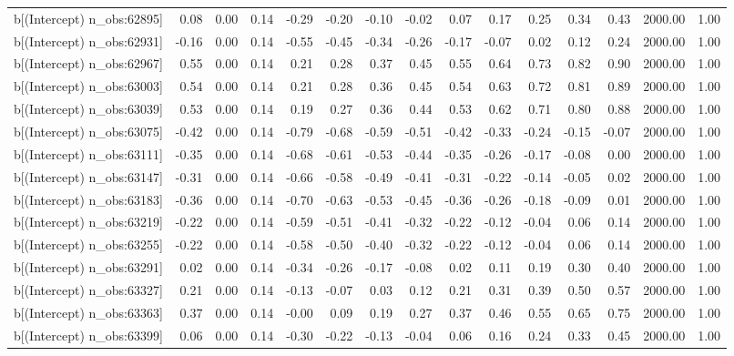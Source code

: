 \begin{table}[ht]
\begin{tabular}{rrrrrrrrrrrrrrr}
  b[(Intercept) n\_obs:62895] & 0.08 & 0.00 & 0.14 & -0.29 & -0.20 & -0.10 & -0.02 & 0.07 & 0.17 & 0.25 & 0.34 & 0.43 & 2000.00 & 1.00 \\ 
  b[(Intercept) n\_obs:62931] & -0.16 & 0.00 & 0.14 & -0.55 & -0.45 & -0.34 & -0.26 & -0.17 & -0.07 & 0.02 & 0.12 & 0.24 & 2000.00 & 1.00 \\ 
  b[(Intercept) n\_obs:62967] & 0.55 & 0.00 & 0.14 & 0.21 & 0.28 & 0.37 & 0.45 & 0.55 & 0.64 & 0.73 & 0.82 & 0.90 & 2000.00 & 1.00 \\ 
  b[(Intercept) n\_obs:63003] & 0.54 & 0.00 & 0.14 & 0.21 & 0.28 & 0.36 & 0.45 & 0.54 & 0.63 & 0.72 & 0.81 & 0.89 & 2000.00 & 1.00 \\ 
  b[(Intercept) n\_obs:63039] & 0.53 & 0.00 & 0.14 & 0.19 & 0.27 & 0.36 & 0.44 & 0.53 & 0.62 & 0.71 & 0.80 & 0.88 & 2000.00 & 1.00 \\ 
  b[(Intercept) n\_obs:63075] & -0.42 & 0.00 & 0.14 & -0.79 & -0.68 & -0.59 & -0.51 & -0.42 & -0.33 & -0.24 & -0.15 & -0.07 & 2000.00 & 1.00 \\ 
  b[(Intercept) n\_obs:63111] & -0.35 & 0.00 & 0.14 & -0.68 & -0.61 & -0.53 & -0.44 & -0.35 & -0.26 & -0.17 & -0.08 & 0.00 & 2000.00 & 1.00 \\ 
  b[(Intercept) n\_obs:63147] & -0.31 & 0.00 & 0.14 & -0.66 & -0.58 & -0.49 & -0.41 & -0.31 & -0.22 & -0.14 & -0.05 & 0.02 & 2000.00 & 1.00 \\ 
  b[(Intercept) n\_obs:63183] & -0.36 & 0.00 & 0.14 & -0.70 & -0.63 & -0.53 & -0.45 & -0.36 & -0.26 & -0.18 & -0.09 & 0.01 & 2000.00 & 1.00 \\ 
  b[(Intercept) n\_obs:63219] & -0.22 & 0.00 & 0.14 & -0.59 & -0.51 & -0.41 & -0.32 & -0.22 & -0.12 & -0.04 & 0.06 & 0.14 & 2000.00 & 1.00 \\ 
  b[(Intercept) n\_obs:63255] & -0.22 & 0.00 & 0.14 & -0.58 & -0.50 & -0.40 & -0.32 & -0.22 & -0.12 & -0.04 & 0.06 & 0.14 & 2000.00 & 1.00 \\ 
  b[(Intercept) n\_obs:63291] & 0.02 & 0.00 & 0.14 & -0.34 & -0.26 & -0.17 & -0.08 & 0.02 & 0.11 & 0.19 & 0.30 & 0.40 & 2000.00 & 1.00 \\ 
  b[(Intercept) n\_obs:63327] & 0.21 & 0.00 & 0.14 & -0.13 & -0.07 & 0.03 & 0.12 & 0.21 & 0.31 & 0.39 & 0.50 & 0.57 & 2000.00 & 1.00 \\ 
  b[(Intercept) n\_obs:63363] & 0.37 & 0.00 & 0.14 & -0.00 & 0.09 & 0.19 & 0.27 & 0.37 & 0.46 & 0.55 & 0.65 & 0.75 & 2000.00 & 1.00 \\ 
  b[(Intercept) n\_obs:63399] & 0.06 & 0.00 & 0.14 & -0.30 & -0.22 & -0.13 & -0.04 & 0.06 & 0.16 & 0.24 & 0.33 & 0.45 & 2000.00 & 1.00 \\ 

\end{tabular}
\end{table}
